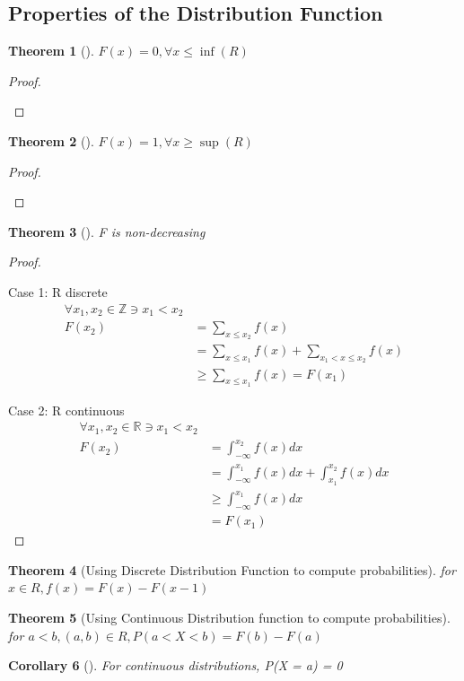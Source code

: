 \documentclass[10pt,]{book}
\theoremstyle{plain}
\newtheorem{theorem}{Theorem}[section]
\newtheorem{corollary}[theorem]{Corollary}
\theoremstyle{definition}
\theoremstyle{definition}
\numberwithin{equation}{section}
\newcommand{\lt}{ < }
\begin{document}
\subsection[Properties of the Distribution Function]{Properties of the Distribution Function}\label{subsection-15}
\begin{theorem}[]\label{theorem-Fmin}
\(F(x)=0, \forall x \le \inf(R)\)\end{theorem}
\begin{proof}\hypertarget{proof-15}{}
\end{proof}
\begin{theorem}[]\label{theorem-Fmax}
\(F(x)=1, \forall x \ge \sup(R)\)\end{theorem}
\begin{proof}\hypertarget{proof-16}{}
\end{proof}
\begin{theorem}[]\label{theorem-24}
F is non-decreasing\end{theorem}
\begin{proof}\hypertarget{proof-17}{}
Case 1: R discrete%
\begin{align*}
\forall x_1,x_2 \in \mathbb{Z} \ni x_1 \lt x_2\\
F(x_2) & = \sum_{x \le x_2} f(x) \\
& = \sum_{x \le x_1} f(x) + \sum_{x_1 \lt x \le x_2} f(x)\\
& \ge \sum_{x \le x_1} f(x) = F(x_1)
\end{align*}\par
Case 2: R continuous%
\begin{align*}
\forall x_1,x_2 \in \mathbb{R} \ni x_1 \lt x_2\\
F(x_2) & = \int_{-\infty}^{x_2} f(x) dx \\
 & = \int_{-\infty}^{x_1} f(x) dx + \int_{x_1}^{x_2} f(x) dx\\
 & \ge \int_{-\infty}^{x_1} f(x) dx\\
 & = F(x_1)
\end{align*}\end{proof}
\begin{theorem}[Using Discrete Distribution Function to compute probabilities]\label{theorem-Fvsf-discrete}
for \(x \in R, f(x) = F(x) - F(x-1)\)\end{theorem}
\begin{theorem}[Using Continuous Distribution function to compute probabilities]\label{theorem-Fvsf-continuyous}
for \(a \lt b, (a,b) \in R, P(a \lt X \lt b) = F(b) - F(a)\)\end{theorem}
\begin{corollary}[]\label{corollary-ProbPointZero-continuous}
For continuous distributions, P(X = a) = 0\end{corollary}
\typeout{************************************************}
\typeout{************************************************}
\end{document}
